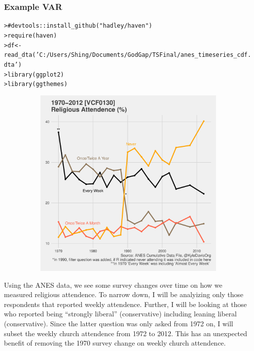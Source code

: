 \documentclass[12pt]{article}\usepackage[]{graphicx}\usepackage[]{color}
\makeatletter
\newcommand{\hlstr}[1]{\textcolor[rgb]{0.82,0.78,0.62}{#1}}%
\newcommand{\hlcom}[1]{\textcolor[rgb]{0.404,0.408,0.42}{#1}}%
\newcommand{\hlstd}[1]{\textcolor[rgb]{0.882,0.878,0.898}{#1}}%
\newcommand{\hlkwb}[1]{\textcolor[rgb]{0.902,0.675,0.196}{#1}}%
\newcommand{\hlkwd}[1]{\textcolor[rgb]{0.733,0.388,0.812}{#1}}%
\newenvironment{kframe}{%
 \def\at@end@of@kframe{}%
 \ifinner\ifhmode%
  \def\at@end@of@kframe{\end{minipage}}%
  \begin{minipage}{\columnwidth}%
 \fi\fi%
 \def\FrameCommand##1{\hskip\@totalleftmargin \hskip-\fboxsep
 \colorbox{shadecolor}{##1}\hskip-\fboxsep
     \hskip-\linewidth \hskip-\@totalleftmargin \hskip\columnwidth}%
 \MakeFramed {\advance\hsize-\width
   \@totalleftmargin\z@ \linewidth\hsize
   \@setminipage}}%
 {\par\unskip\endMakeFramed%
 \at@end@of@kframe}
\newenvironment{knitrout}{}{} %
\makeatother
\begin{document}
\begin{flushleft}
\subsubsection{Example VAR}

\begin{knitrout}
\color{fgcolor}\begin{kframe}
\begin{alltt}
\hlstd{> }\hlcom{# devtools::install_github("hadley/haven")}
\hlstd{> }\hlkwd{require}\hlstd{(haven)}
\hlstd{> }\hlstd{df} \hlkwb{<-} \hlkwd{read_dta}\hlstd{(}\hlstr{'C:/Users/Shing/Documents/GodGap/TS Final/anes_timeseries_cdf.dta'}\hlstd{)}
\hlstd{> }\hlkwd{library}\hlstd{(ggplot2)}
\hlstd{> }\hlkwd{library}\hlstd{(ggthemes)}
\end{alltt}
\end{kframe}
\end{knitrout}

\begin{center}
\begin{knitrout}
\color{fgcolor}
\includegraphics[width=6in,height=3.7in]{figure/desc-1} 

\end{knitrout}
\end{center}

Using the ANES data, we see some survey changes over time on how we measured religious attendence. To narrow down, I will be analyizing only those respondents that reported weekly attendence. Further, I will be looking at those who reported being ``strongly liberal'' (conservative) including leaning liberal (conservative). Since the latter question was only asked from 1972 on, I will subset the weekly church attendence from 1972 to 2012. This has an unexpected benefit of removing the 1970 survey change on weekly church attendence.


\end{flushleft}
\end{document}
